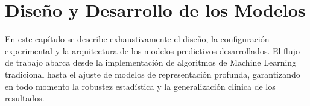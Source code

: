\chapter{Diseño y Desarrollo de los Modelos}\label{ch:diseno}

En este capítulo se describe exhaustivamente el diseño, la configuración experimental y la arquitectura de los modelos predictivos desarrollados. El flujo de trabajo abarca desde la implementación de algoritmos de Machine Learning tradicional hasta el ajuste de modelos de representación profunda, garantizando en todo momento la robustez estadística y la generalización clínica de los resultados.

    
    
    
    
    